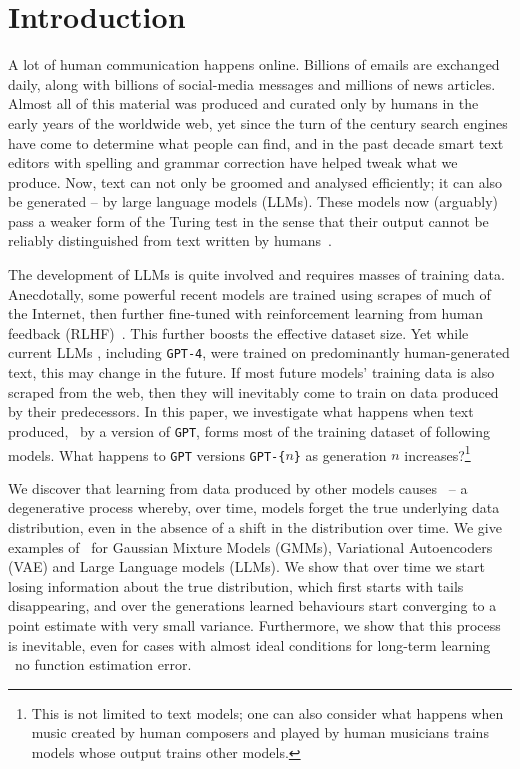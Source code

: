 \section{Introduction}

A lot of human communication happens online. Billions of emails are exchanged daily, along with billions of social-media messages and millions of news articles. Almost all of this material was produced and curated only by humans in the early years of the worldwide web, yet since the turn of the century search engines have come to determine what people can find, and in the past decade smart text editors with spelling and grammar correction have helped tweak what we produce. %
Now, text can not only be groomed and analysed efficiently; it can also be generated -- by large language models (LLMs). These models now (arguably) pass a weaker form of the Turing test in the sense that their output cannot be reliably distinguished from text written by humans~\citep{solaiman2019release}.

The development of LLMs is quite involved and requires masses of training data. Anecdotally, some powerful recent models are trained using scrapes of much of the Internet, then further fine-tuned with reinforcement learning from human feedback (RLHF)~\citep{NIPS2013_e034fb6b,openai2023gpt4}. This further boosts the effective dataset size. Yet while current LLMs \citep{devlin2018bert, liu2019roberta, brown2020language, zhang2022opt}, including \texttt{GPT-4}, were trained on predominantly human-generated text, this may change in the future. If most future models' training data is also scraped from the web, then they will inevitably come to train on data produced by their predecessors. In this paper, we investigate what happens when text produced, \eg~by a version of \texttt{GPT}, forms most of the training dataset of following models. What happens to \texttt{GPT} versions \texttt{GPT-\{$n$\}} as generation $n$ increases?\footnote{This is not limited to text models; one can also consider what happens when music created by human composers and played by human musicians trains models whose output trains other models.}

We discover that learning from data produced by other models causes \md~-- a degenerative process whereby, over time, models forget the true underlying data distribution, even in the absence of a shift in the distribution over time. We give examples of \md~for Gaussian Mixture Models (GMMs), Variational Autoencoders (VAE) and Large Language models (LLMs). We show that over time we start losing information about the true distribution, which first starts with tails disappearing, and over the generations learned behaviours start converging to a point estimate with very small variance. Furthermore, we show that this process is inevitable, even for cases with almost ideal conditions for long-term learning \ie~no function estimation error.

